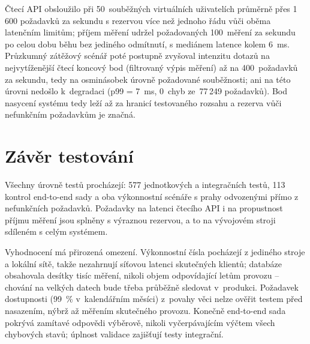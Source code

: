 Čtecí API obsloužilo při 50~souběžných virtuálních uživatelích průměrně přes 1\,600 požadavků za sekundu s rezervou více než jednoho řádu vůči oběma latenčním limitům; příjem měření udržel požadovaných 100~měření za sekundu po celou dobu běhu bez jediného odmítnutí, s mediánem latence kolem 6~ms. Průzkumný zátěžový scénář poté postupně zvyšoval intenzitu dotazů na nejvytíženější čtecí koncový bod (filtrovaný výpis měření) až na 400~požadavků za sekundu, tedy na osminásobek úrovně požadované souběžnosti; ani na této úrovni nedošlo k~degradaci (p99 = 7~ms, 0~chyb ze~77\,249 požadavků). Bod nasycení systému tedy leží až za hranicí testovaného rozsahu a rezerva vůči nefunkčním požadavkům je značná.

\section{Závěr testování}

Všechny úrovně testů procházejí: 577 jednotkových a integračních testů, 113 kontrol end-to-end sady a oba výkonnostní scénáře s prahy odvozenými přímo z nefunkčních požadavků. Požadavky na latenci čtecího API i na propustnost příjmu měření jsou splněny s výraznou rezervou, a to na vývojovém stroji sdíleném s celým systémem.

Vyhodnocení má přirozená omezení. Výkonnostní čísla pocházejí z jediného stroje a lokální sítě, takže nezahrnují síťovou latenci skutečných klientů; databáze obsahovala desítky tisíc měření, nikoli objem odpovídající letům provozu -- chování na velkých datech bude třeba průběžně sledovat v~produkci. Požadavek dostupnosti (99~\% v~kalendářním měsíci) z~povahy věci nelze ověřit testem před nasazením, nýbrž až měřením skutečného provozu. Konečně end-to-end sada pokrývá zamítavé odpovědi výběrově, nikoli vyčerpávajícím výčtem všech chybových stavů; úplnost validace zajišťují testy integrační.
